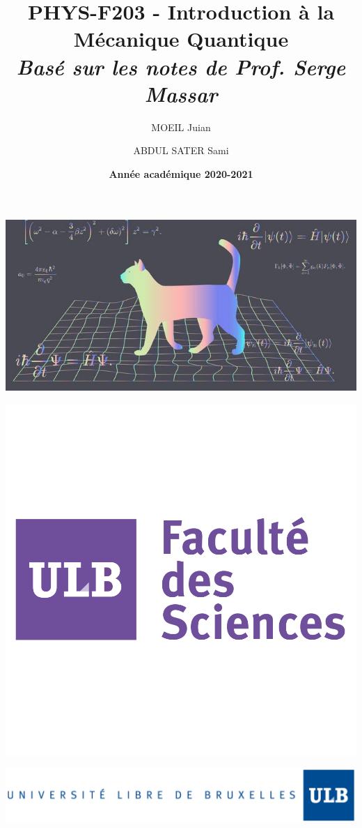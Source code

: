 \documentclass[a4paper]{article}
\title{\textbf{PHYS-F203 - Introduction à la Mécanique Quantique} \\ \textit{Basé sur les notes de Prof. Serge Massar}}
\author{MOEIL Juian \and ABDUL SATER Sami}
\date{\textbf{Année académique 2020-2021}}
\numberwithin{equation}{part}
\begin{document}
\maketitle
\begin{center}
    \includegraphics[scale=0.65]{Images/cat.jpg}
\end{center}
\begin{center}
    \includegraphics[scale=0.2]{Images/sciences.png}
\end{center}
\begin{center}
    \includegraphics[scale=0.50]{Images/ULB.jpg}
\end{center}
\end{document}
